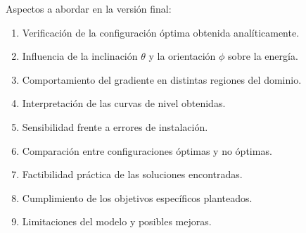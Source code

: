 \documentclass[12pt,a4paper]{article}
\begin{document}
Aspectos a abordar en la versión final:
\begin{enumerate}
    \item Verificación de la configuración óptima obtenida analíticamente.
    \item Influencia de la inclinación $\theta$ y la orientación $\phi$ sobre la energía.
    \item Comportamiento del gradiente en distintas regiones del dominio.
    \item Interpretación de las curvas de nivel obtenidas.
    \item Sensibilidad frente a errores de instalación.
    \item Comparación entre configuraciones óptimas y no óptimas.
    \item Factibilidad práctica de las soluciones encontradas.
    \item Cumplimiento de los objetivos específicos planteados.
    \item Limitaciones del modelo y posibles mejoras.
\end{enumerate}



\end{document}
